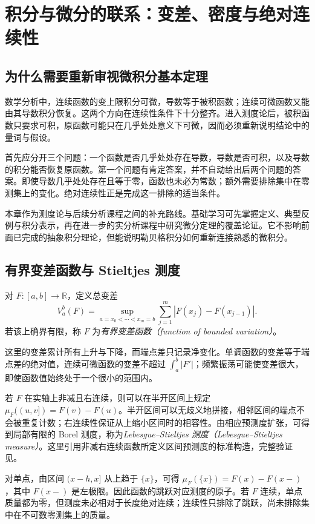\setcounter{chapter}{11} %
\chapter{积分与微分的联系：变差、密度与绝对连续性}
\label{chap:mt-calculus}

\section{为什么需要重新审视微积分基本定理}
数学分析中，连续函数的变上限积分可微，导数等于被积函数；连续可微函数又能由其导数积分恢复。这两个方向在连续性条件下十分整齐。进入测度论后，被积函数只要求可积，原函数可能只在几乎处处意义下可微，因而必须重新说明结论中的量词与假设。

首先应分开三个问题：一个函数是否几乎处处存在导数，导数是否可积，以及导数的积分能否恢复原函数。第一个问题有肯定答案，并不自动给出后两个问题的答案。即使导数几乎处处存在且等于零，函数也未必为常数；额外需要排除集中在零测集上的变化。绝对连续性正是完成这一排除的适当条件。

本章作为测度论与后续分析课程之间的补充路线。基础学习可先掌握定义、典型反例与积分表示，再在进一步的实分析课程中研究微分定理的覆盖论证。它不影响前面已完成的抽象积分理论，但能说明勒贝格积分如何重新连接熟悉的微积分。

\section{有界变差函数与 Stieltjes 测度}
\begin{definition}
对 $F:[a,b]\to\mathbb R$，定义总变差
\[
 V_a^b(F)=\sup_{a=x_0<\cdots<x_m=b}
 \sum_{j=1}^{m}|F(x_j)-F(x_{j-1})|.
\]
若该上确界有限，称 $F$ 为\emph{有界变差函数（function of bounded variation）}。
\end{definition}
这里的变差累计所有上升与下降，而端点差只记录净变化。单调函数的变差等于端点差的绝对值，连续可微函数的变差不超过 $\int_a^b|F'|$；频繁振荡可能使变差很大，即使函数值始终处于一个很小的范围内。

若 $F$ 在实轴上非减且右连续，则可以在半开区间上规定
$\mu_F((u,v])=F(v)-F(u)$。半开区间可以无歧义地拼接，相邻区间的端点不会被重复计数；右连续性保证从上缩小区间时的相容性。由相应预测度扩张，可得到局部有限的 Borel 测度，称为\emph{Lebesgue--Stieltjes 测度（Lebesgue--Stieltjes measure）}。这里引用非减右连续函数所定义区间预测度的标准构造，完整验证见\cite[第1章]{teschl-ra}。

对单点，由区间 $(x-h,x]$ 从上趋于 $\{x\}$，可得
$\mu_F(\{x\})=F(x)-F(x-)$，其中 $F(x-)$ 是左极限。因此函数的跳跃对应测度的原子。若 $F$ 连续，单点质量都为零，但测度未必相对于长度绝对连续；连续性只排除了跳跃，尚未排除集中在不可数零测集上的质量。

